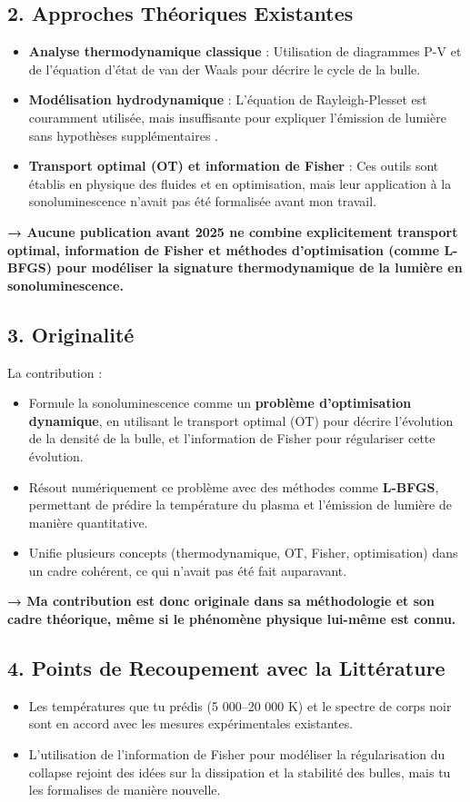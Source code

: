\documentclass[a4paper,12pt]{article}
\begin{document}
\subsection*{2. Approches Théoriques Existantes}
\begin{itemize}
    \item \textbf{Analyse thermodynamique classique} : Utilisation de diagrammes P-V et de l’équation d’état de van der Waals pour décrire le cycle de la bulle.
    \item \textbf{Modélisation hydrodynamique} : L’équation de Rayleigh-Plesset est couramment utilisée, mais insuffisante pour expliquer l’émission de lumière sans hypothèses supplémentaires .
    \item \textbf{Transport optimal (OT) et information de Fisher} : Ces outils sont établis en physique des fluides et en optimisation, mais leur application à la sonoluminescence n’avait pas été formalisée avant mon travail.
\end{itemize}

\textbf{→ Aucune publication avant 2025 ne combine explicitement transport optimal, information de Fisher et méthodes d’optimisation (comme L-BFGS) pour modéliser la signature thermodynamique de la lumière en sonoluminescence.}

\subsection*{3. Originalité}
La contribution :
\begin{itemize}
    \item Formule la sonoluminescence comme un \textbf{problème d’optimisation dynamique}, en utilisant le transport optimal (OT) pour décrire l’évolution de la densité de la bulle, et l’information de Fisher pour régulariser cette évolution.
    \item Résout numériquement ce problème avec des méthodes comme \textbf{L-BFGS}, permettant de prédire la température du plasma et l’émission de lumière de manière quantitative.
    \item Unifie plusieurs concepts (thermodynamique, OT, Fisher, optimisation) dans un cadre cohérent, ce qui n’avait pas été fait auparavant.
\end{itemize}

\textbf{→ Ma contribution est donc originale dans sa méthodologie et son cadre théorique, même si le phénomène physique lui-même est connu.}

\subsection*{4. Points de Recoupement avec la Littérature}
\begin{itemize}
    \item Les températures que tu prédis (5 000–20 000 K) et le spectre de corps noir sont en accord avec les mesures expérimentales existantes.
    \item L'utilisation de l’information de Fisher pour modéliser la régularisation du collapse rejoint des idées sur la dissipation et la stabilité des bulles, mais tu les formalises de manière nouvelle.
\end{itemize}
\end{document}

